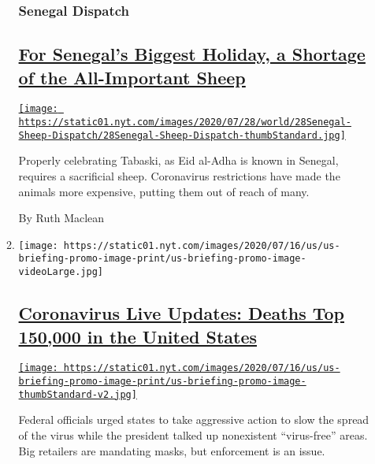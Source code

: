 \begin{enumerate}
\begin{enumerate}
    \hypertarget{senegal-dispatch}{%
    \subsubsection{Senegal Dispatch}\label{senegal-dispatch}}

    \hypertarget{for-senegals-biggest-holiday-a-shortage-of-the-all-important-sheep}{%
    \subsection{\texorpdfstring{\href{/2020/07/29/world/africa/senegal-tabaski-sheep-eid-adha.html}{For
    Senegal's Biggest Holiday, a Shortage of the All-Important
    Sheep}}{For Senegal's Biggest Holiday, a Shortage of the All-Important Sheep}}\label{for-senegals-biggest-holiday-a-shortage-of-the-all-important-sheep}}

    \href{/2020/07/29/world/africa/senegal-tabaski-sheep-eid-adha.html}{\texttt{[image: https://static01.nyt.com/images/2020/07/28/world/28Senegal-Sheep-Dispatch/28Senegal-Sheep-Dispatch-thumbStandard.jpg]}}

    Properly celebrating Tabaski, as Eid al-Adha is known in Senegal,
    requires a sacrificial sheep. Coronavirus restrictions have made the
    animals more expensive, putting them out of reach of many.

    By Ruth Maclean
  \item
    \texttt{[image: https://static01.nyt.com/images/2020/07/16/us/us-briefing-promo-image-print/us-briefing-promo-image-videoLarge.jpg]}

    \hypertarget{coronavirus-live-updates-deaths-top-150000-in-the-united-states}{%
    \subsection{\texorpdfstring{\href{/2020/07/29/world/coronavirus-covid-19.html}{Coronavirus
    Live Updates: Deaths Top 150,000 in the United
    States}}{Coronavirus Live Updates: Deaths Top 150,000 in the United States}}\label{coronavirus-live-updates-deaths-top-150000-in-the-united-states}}

    \href{/2020/07/29/world/coronavirus-covid-19.html}{\texttt{[image: https://static01.nyt.com/images/2020/07/16/us/us-briefing-promo-image-print/us-briefing-promo-image-thumbStandard-v2.jpg]}}

    Federal officials urged states to take aggressive action to slow the
    spread of the virus while the president talked up nonexistent
    ``virus-free'' areas. Big retailers are mandating masks, but
    enforcement is an issue.
  \end{enumerate}
\end{enumerate}

